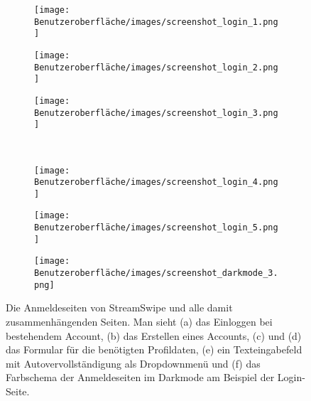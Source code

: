 \begin{figure}[H]
	\begin{subfigure}{0.33\textwidth}
	\centering
	\texttt{[image: Benutzeroberfläche/images/screenshot\_login\_1.png]}
	\caption{}
	\label{fig:login_a}
	\end{subfigure}
	\begin{subfigure}{0.33\textwidth}
	\centering
	\texttt{[image: Benutzeroberfläche/images/screenshot\_login\_2.png]}
	\caption{}
	\label{fig:login_b}
	\end{subfigure}
	\begin{subfigure}{0.33\textwidth}
	\centering
	\texttt{[image: Benutzeroberfläche/images/screenshot\_login\_3.png]}
	\caption{}
	\label{fig:login_c}
	\end{subfigure}\\ \vspace{1cm}	
	
	\begin{subfigure}{0.33\textwidth}
	\centering
	\texttt{[image: Benutzeroberfläche/images/screenshot\_login\_4.png]}
	\caption{}
	\label{fig:login_d}
	\end{subfigure}
	\begin{subfigure}{0.33\textwidth}
	\centering
	\texttt{[image: Benutzeroberfläche/images/screenshot\_login\_5.png]}
	\caption{}
	\label{fig:login_e}
	\end{subfigure}
	\begin{subfigure}{0.33\textwidth}
	\centering
	\texttt{[image: Benutzeroberfläche/images/screenshot\_darkmode\_3.png]}
	\caption{}
	\label{fig:login_f}
	\end{subfigure}
\caption[Screenshots der Anmeldeseiten]{Die Anmeldeseiten von StreamSwipe und alle damit zusammenhängenden Seiten. Man sieht (a) das Einloggen bei bestehendem Account, (b) das Erstellen eines Accounts, (c) und (d) das Formular für die benötigten Profildaten, (e) ein Texteingabefeld mit Autovervollständigung als Dropdownmenü und (f) das Farbschema der Anmeldeseiten im Darkmode am Beispiel der Login-Seite.}
\label{fig:login_alle}
\end{figure}
